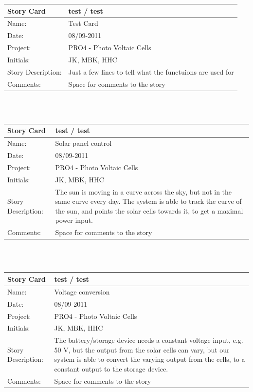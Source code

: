\documentclass[12pt,a4paper]{report}
\begin{document}
\begin{tabular}{|l|p{12cm}|}
\hline Story Card & test / test \\ 
\hline Name: & Test Card \\ 
\hline Date: & 08/09-2011 \\ 
\hline Project: & PRO4 - Photo Voltaic Cells \\ 
\hline Initials: & JK, MBK, HHC \\ 
\hline Story Description: & Just a few lines to tell what the functuions are used for \\ 
\hline Comments: & Space for comments to the story \\ 
\hline 
\end{tabular} \\
\\
\begin{tabular}{|l|p{12cm}|}
\hline Story Card & test / test \\ 
\hline Name: & Solar panel control \\ 
\hline Date: & 08/09-2011 \\ 
\hline Project: & PRO4 - Photo Voltaic Cells \\ 
\hline Initials: & JK, MBK, HHC \\ 
\hline Story Description: & The sun is moving in a curve across the sky, but not in the same curve every day. The system is able to track the curve of the sun, and points the solar cells towards it, to get a maximal power input. \\ 
\hline Comments: & Space for comments to the story \\ 
\hline 
\end{tabular} \\
\\
\begin{tabular}{|l|p{12cm}|}
\hline Story Card & test / test \\ 
\hline Name: & Voltage conversion \\ 
\hline Date: & 08/09-2011 \\ 
\hline Project: & PRO4 - Photo Voltaic Cells \\ 
\hline Initials: & JK, MBK, HHC \\ 
\hline Story Description: & The battery/storage device needs a constant voltage input, e.g. 50 V, but the output from the solar cells can vary, but our system is able to convert the varying output from the cells, to a constant output to the storage device. \\ 
\hline Comments: & Space for comments to the story \\ 
\hline 
\end{tabular} \\
\end{document}
